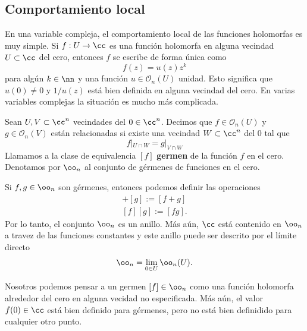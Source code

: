 \subsection{Comportamiento local}\label{complocal}

En una variable compleja, el comportamiento local de las funciones holomorfas es muy simple. Si $f:U\to\cc$ es una función holomorfa en alguna vecindad $U\subset\cc$ del cero, entonces $f$ se escribe de forma única como
\begin{equation*}
	f(z)=u(z)z^k
\end{equation*} 
para algún $k\in\nn$ y una función $u\in\mathscr{O}_n(U)$ unidad. Esto significa que $u(0)\neq 0$ y $1/u(z)$ está bien definida en alguna vecindad del cero. En varias variables complejas la situación es mucho más complicada.\\
\begin{definition}
	Sean $U,V\subset \cc^n$ vecindades del $0\in\cc^n$. Decimos que $f\in\mathscr{O}_n(U)$ y $g\in\mathscr{O}_n(V)$ están relacionadas si existe una vecindad $W\subset\cc^n$ del $0$ tal que
	\begin{equation*}
		f|_{U\cap W}=g|_{V\cap W}
	\end{equation*} 
	Llamamos a la clase de equivalencia $[f]$ \textbf{germen} de la función $f$ en el cero.
	Denotamos por $\oo_{n}$ al conjunto de gérmenes de funciones en el cero.
\end{definition}

\begin{remark}
	Si $f,g\in \oo_{n}$ son gérmenes, entonces podemos definir las operaciones
	\begin{align*}
		[f]+[g]:=[f+g]\\
		[f][g]:=[fg].
	\end{align*}
	Por lo tanto, el conjunto $\oo_{n}$ es un anillo. Más aún, $\cc$ está contenido en $\oo_{n}$ a travez de las funciones constantes y este anillo puede ser descrito por el límite directo
	\begin{equation*}
		\oo_{n}=\lim_{0\in U}\oo_n(U).
	\end{equation*} 
\end{remark}

Nosotros podemos pensar a un germen $[f]\in\oo_{n}$ como una función holomorfa alrededor del cero en alguna vecidad no especificada. Más aún, el valor $f(0)\in\cc$ está bien definido para gérmenes, pero no está bien definidido para cualquier otro punto.\\

